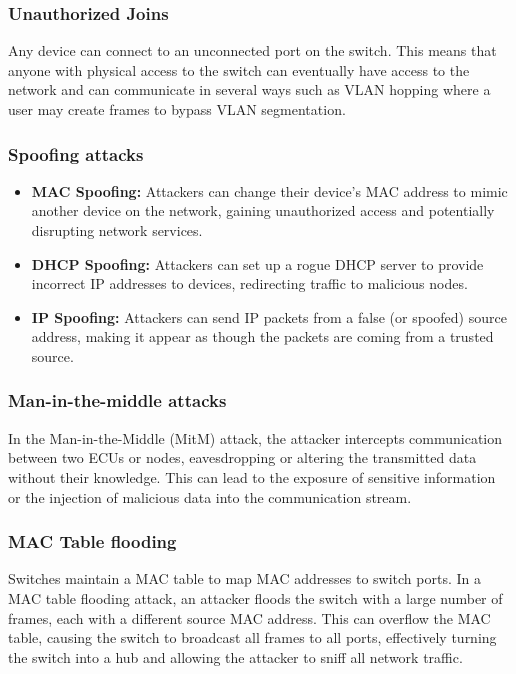 \documentclass{report}
\begin{document}
\subsubsection{Unauthorized Joins}
Any device can connect to an unconnected port on the switch. This means that anyone with physical access to the switch can eventually have access to the network and can communicate in several ways such as VLAN hopping where a user may create frames to bypass VLAN segmentation.

\subsubsection{Spoofing attacks}
\begin{itemize}
    \item \textbf{MAC Spoofing:} Attackers can change their device’s MAC address to mimic another device on the network, gaining unauthorized access and potentially disrupting network services.
    \item \textbf{DHCP Spoofing:} Attackers can set up a rogue DHCP server to provide incorrect IP addresses to devices, redirecting traffic to malicious nodes.
    \item \textbf{IP Spoofing:} Attackers can send IP packets from a false (or spoofed) source address, making it appear as though the packets are coming from a trusted source.
\end{itemize}

\subsubsection{Man-in-the-middle attacks}
In the Man-in-the-Middle (MitM) attack, the attacker intercepts communication between two ECUs or nodes, eavesdropping or altering the transmitted data without their knowledge. This can lead to the exposure of sensitive information or the injection of malicious data into the communication stream.

\subsubsection{MAC Table flooding}
Switches maintain a MAC table to map MAC addresses to switch ports. In a MAC table flooding attack, an attacker floods the switch with a large number of frames, each with a different source MAC address. This can overflow the MAC table, causing the switch to broadcast all frames to all ports, effectively turning the switch into a hub and allowing the attacker to sniff all network traffic.
\end{document}
